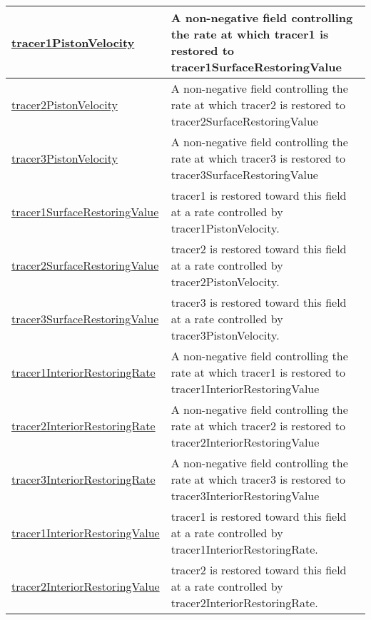 {\begin{center}
\begin{longtable}{| p{2.0in} | p{4.0in} |}
    \hline
    \hyperref[subsec:var_sec_forcing_tracer1PistonVelocity]{tracer1PistonVelocity} & A non-negative field controlling the rate at which tracer1 is restored to tracer1SurfaceRestoringValue \\
    \hline
    \hyperref[subsec:var_sec_forcing_tracer2PistonVelocity]{tracer2PistonVelocity} & A non-negative field controlling the rate at which tracer2 is restored to tracer2SurfaceRestoringValue \\
    \hline
    \hyperref[subsec:var_sec_forcing_tracer3PistonVelocity]{tracer3PistonVelocity} & A non-negative field controlling the rate at which tracer3 is restored to tracer3SurfaceRestoringValue \\
    \hline
    \hyperref[subsec:var_sec_forcing_tracer1SurfaceRestoringValue]{tracer1SurfaceRestoringValue} & tracer1 is restored toward this field at a rate controlled by tracer1PistonVelocity. \\
    \hline
    \hyperref[subsec:var_sec_forcing_tracer2SurfaceRestoringValue]{tracer2SurfaceRestoringValue} & tracer2 is restored toward this field at a rate controlled by tracer2PistonVelocity. \\
    \hline
    \hyperref[subsec:var_sec_forcing_tracer3SurfaceRestoringValue]{tracer3SurfaceRestoringValue} & tracer3 is restored toward this field at a rate controlled by tracer3PistonVelocity. \\
    \hline
    \hyperref[subsec:var_sec_forcing_tracer1InteriorRestoringRate]{tracer1InteriorRestoringRate} & A non-negative field controlling the rate at which tracer1 is restored to tracer1InteriorRestoringValue \\
    \hline
    \hyperref[subsec:var_sec_forcing_tracer2InteriorRestoringRate]{tracer2InteriorRestoringRate} & A non-negative field controlling the rate at which tracer2 is restored to tracer2InteriorRestoringValue \\
    \hline
    \hyperref[subsec:var_sec_forcing_tracer3InteriorRestoringRate]{tracer3InteriorRestoringRate} & A non-negative field controlling the rate at which tracer3 is restored to tracer3InteriorRestoringValue \\
    \hline
    \hyperref[subsec:var_sec_forcing_tracer1InteriorRestoringValue]{tracer1InteriorRestoringValue} & tracer1 is restored toward this field at a rate controlled by tracer1InteriorRestoringRate. \\
    \hline
    \hyperref[subsec:var_sec_forcing_tracer2InteriorRestoringValue]{tracer2InteriorRestoringValue} & tracer2 is restored toward this field at a rate controlled by tracer2InteriorRestoringRate. \\

\end{longtable}
\end{center}}
